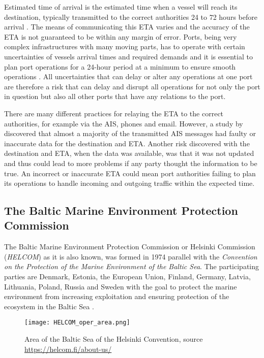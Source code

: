 \documentclass[../main.tex]{subfiles}
\begin{document}
Estimated time of arrival is the estimated time when a vessel will reach its destination, typically transmitted to the correct authorities 24 to 72 hours before arrival \cite{Veenstra_2021, EU_2009}. The means of communicating this ETA varies and the accuracy of the ETA is not guaranteed to be within any margin of error. Ports, being very complex infrastructures with many moving parts, has to operate with certain uncertainties of vessels arrival times and required demands and it is essential to plan port operations for a 24-hour period at a minimum to ensure smooth operations \cite{Fancello_2011}. All uncertainties that can delay or alter any operations at one port are therefore a risk that can delay and disrupt all operations for not only the port in question but also all other ports that have any relations to the port.

There are many different practices for relaying the ETA to the correct authorities, for example via the AIS, phones and email. However, a study by  \cite{Mokhtari_2008} discovered that almost a majority of the transmitted AIS messages had faulty or inaccurate data for the destination and ETA. Another risk discovered with the destination and ETA, when the data was available, was that it was not updated and thus could lead to more problems if any party thought the information to be true. An incorrect or inaccurate ETA could mean port authorities failing to plan its operations to handle incoming and outgoing traffic within the expected time.

\subsection{The Baltic Marine Environment Protection Commission}

The Baltic Marine Environment Protection Commission or Helsinki Commission (\textit{HELCOM}) as it is also known, was formed in 1974 parallel with the \textit{Convention on the Protection of the Marine Environment of the Baltic Sea}. The participating parties are Denmark, Estonia, the European Union, Finland, Germany, Latvia, Lithuania, Poland, Russia and Sweden with the goal to protect the marine environment from increasing exploitation and ensuring protection of the ecosystem in the Baltic Sea \cite{HELCOM_2014}.

\begin{figure}[H]
	\centering
	\texttt{[image: HELCOM\_oper\_area.png]}
	\caption{Area of the Baltic Sea of the Helsinki Convention, source \protect\url{https://helcom.fi/about-us/}}
	\label{fig:helcom-area}
\end{figure}
\end{document}
